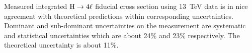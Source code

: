 \begin{table}[!h!tb]
\begin{center}
\begin{tabular}{|c|c|}
%
\hline %
\end{tabular}
\end{center}
\end{table}

 
Measured integrated $\mathrm{H}\rightarrow4\ell$ fiducial cross section using 13~TeV data is in nice agreement with theoretical predictions within corresponding uncertainties. Dominant and sub-dominant uncertainties on the measurement are systematic and statistical uncertainties which are about 24\% and  23\% respectively. The theoretical uncertainty is about 11\%.  %
 
